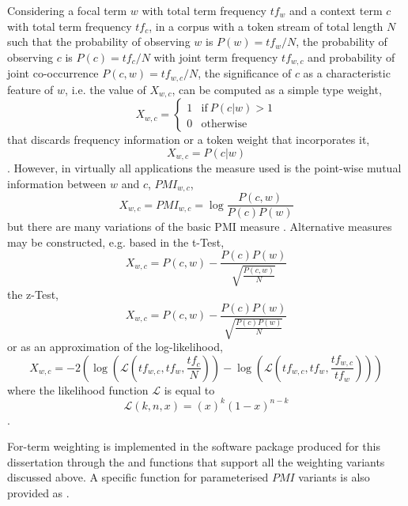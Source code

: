 Considering a focal term $w$ with total term frequency $tf_{w}$ and a context term $c$ with total term frequency $tf_{c}$, in a corpus with a token stream of total length $N$ such that the probability of observing $w$ is $P( w ) = tf_{w} / N$, the probability of observing $c$ is $P( c ) = tf_{c} / N$ with joint term frequency $tf_{w,c}$ and probability of joint co-occurrence $P( c, w ) = tf_{w,c} / N$, the significance of $c$ as a characteristic feature of $w$, i.e. the value of $X_{w,c}$, can be computed as a simple type weight,
    $$ X_{w,c} = \begin{cases}
        1 & \text{if}\ P( c | w ) > 1 \\
        0 & \text{otherwise}
    \end{cases}
    $$
that discards frequency information or a token weight that incorporates it,
    $$ X_{w,c} = P( c | w ) $$
.
However, in virtually all applications the measure used is the point-wise mutual information between $w$ and $c$, $PMI_{w,c}$,
    $$ X_{w,c} = PMI_{w,c} = \log \frac{ P( c, w ) }{ P( c )P( w ) } $$
but there are many variations of the basic PMI measure .
Alternative measures may be constructed, e.g. based in the t-Test,
    $$ X_{w,c} = P( c, w ) - \frac{P( c )P( w )}{\sqrt{ \frac{P( c, w )}{N} } } $$
the z-Test,
    $$ X_{w,c} = P( c, w ) - \frac{P( c )P( w )}{\sqrt{ \frac{P( c )P( w )}{N} } } $$
or as an approximation of the log-likelihood,
    $$
    X_{w,c} = -2 \left(
        \log \left( \mathcal{L} \left( tf_{w,c}, tf_{w}, \frac{tf_{c}}{N} \right) \right)
        -
        \log \left( \mathcal{L} \left( tf_{w,c}, tf_{w}, \frac{tf_{w,c}}{tf_{w}} \right) \right)
    \right)
    $$
where the likelihood function $\mathcal{L}$ is equal to
    $$ \mathcal{L}(k,n,x) = (x)^{k} ( 1- x )^{n-k} $$
.

For-term weighting is implemented in the  software package produced for this dissertation through the  and  functions that support all the weighting variants discussed above.
A specific function for parameterised $PMI$ variants is also provided as .
